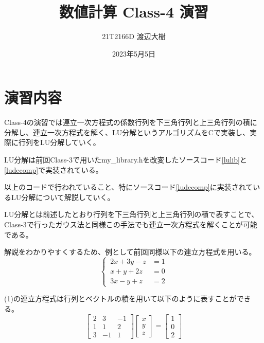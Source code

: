 \documentclass[a4paper,11pt]{jsarticle}
\begin{document}
\title{数値計算 Class-4 演習}
\author{21T2166D 渡辺大樹}
\date{2023年5月5日}
\maketitle

\section{演習内容}
Class-4の演習では連立一次方程式の係数行列を下三角行列と上三角行列の積に分解し、連立一次方程式を解く、LU分解というアルゴリズムをCで実装し、実際に行列をLU分解していく。

LU分解は前回Class-3で用いたmy\_library.hを改変したソースコード\ref{lulib}と\ref{ludecomp}で実装されている。

\newpage


以上のコードで行われていること、特にソースコード\ref{ludecomp}に実装されているLU分解について解説していく。

LU分解とは前述したとおり行列を下三角行列と上三角行列の積で表すことで、Class-3で行ったガウス法と同様この手法でも連立一次方程式を解くことが可能である。

解説をわかりやすくするため、例として前回同様以下の連立方程式を用いる。
\begin{equation}
    \left \{ \,
    \begin{aligned}
        2x + 3y - z &= 1 \\
        x + y + 2z &= 0 \\
        3x - y + z &= 2
    \end{aligned}
    \right .
\end{equation}

(1)の連立方程式は行列とベクトルの積を用いて以下のように表すことができる。
\\
\begin{equation}
    \begin{bmatrix}
        2 & 3 & -1 \\
        1 & 1 & 2 \\
        3 & -1 & 1
    \end{bmatrix}
    \begin{bmatrix}
        x \\ y \\ z
    \end{bmatrix}
    =
    \begin{bmatrix}
        1 \\ 0 \\ 2
    \end{bmatrix}
\end{equation}
\\
\end{document}
